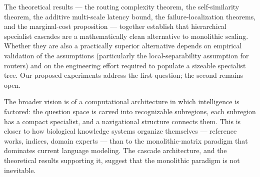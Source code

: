 \documentclass[11pt,twocolumn,a4paper]{article}
\theoremstyle{definition}
\theoremstyle{remark}
\begin{document}
The theoretical results --- the routing complexity theorem, the self-similarity theorem, the additive multi-scale latency bound, the failure-localization theorems, and the marginal-cost proposition --- together establish that hierarchical specialist cascades are a mathematically clean alternative to monolithic scaling. Whether they are also a practically superior alternative depends on empirical validation of the assumptions (particularly the local-separability assumption for routers) and on the engineering effort required to populate a sizeable specialist tree. Our proposed experiments address the first question; the second remains open.

The broader vision is of a computational architecture in which intelligence is factored: the question space is carved into recognizable subregions, each subregion has a compact specialist, and a navigational structure connects them. This is closer to how biological knowledge systems organize themselves --- reference works, indices, domain experts --- than to the monolithic-matrix paradigm that dominates current language modeling. The cascade architecture, and the theoretical results supporting it, suggest that the monolithic paradigm is not inevitable.



\end{document}
